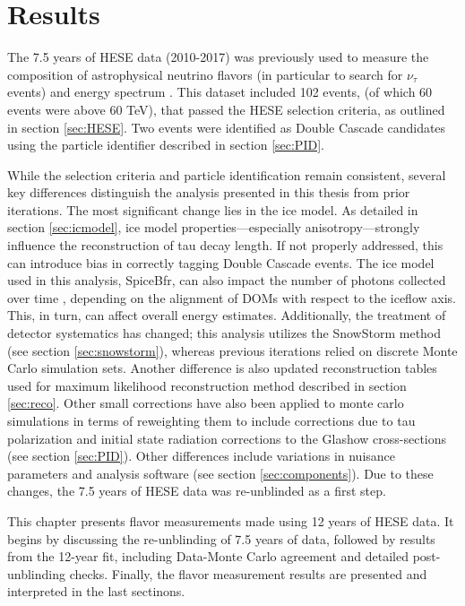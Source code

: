 \setchapterpreamble[u]{\margintoc}
\chapter{Results}
The 7.5 years of HESE data (2010-2017) was previously used to measure the composition of astrophysical neutrino flavors  (in particular to search for $\nu_{\tau}$ events) and energy spectrum . This dataset included 102 events, (of which 60 events were above 60 TeV), that passed the HESE selection criteria, as outlined in section \ref{sec:HESE}. Two events were identified as Double Cascade candidates using the particle identifier described in section \ref{sec:PID}. 

While the selection criteria and particle identification remain consistent, several key differences distinguish the analysis presented in this thesis from prior iterations. The most significant change lies in the ice model. As detailed in section \ref{sec:icmodel}, ice model properties—especially anisotropy—strongly influence the reconstruction of tau decay length. If not properly addressed, this can introduce bias in correctly tagging Double Cascade events. The ice model used in this analysis, SpiceBfr, can also impact the number of photons collected over time , depending on the alignment of DOMs with respect to the iceflow axis. This, in turn, can affect overall energy estimates. Additionally, the treatment of detector systematics has changed; this analysis utilizes the SnowStorm method (see section \ref{sec:snowstorm}), whereas previous iterations relied on discrete Monte Carlo simulation sets. Another difference is also updated reconstruction tables used for maximum likelihood reconstruction method described in section \ref{sec:reco}. Other small corrections have also been applied to monte carlo simulations in terms of reweighting them to include corrections due to tau polarization and initial state radiation corrections to the Glashow cross-sections (see section \ref{sec:PID}). Other differences include variations in nuisance parameters and analysis software (see section \ref{sec:components}). Due to these changes, the 7.5 years of HESE data was re-unblinded as a first step.

This chapter presents flavor measurements made using 12 years of HESE data. It begins by discussing the re-unblinding of 7.5 years of data, followed by results from the 12-year fit, including Data-Monte Carlo agreement and detailed post-unblinding checks. Finally, the flavor measurement results are presented and interpreted in the last sectinons.

